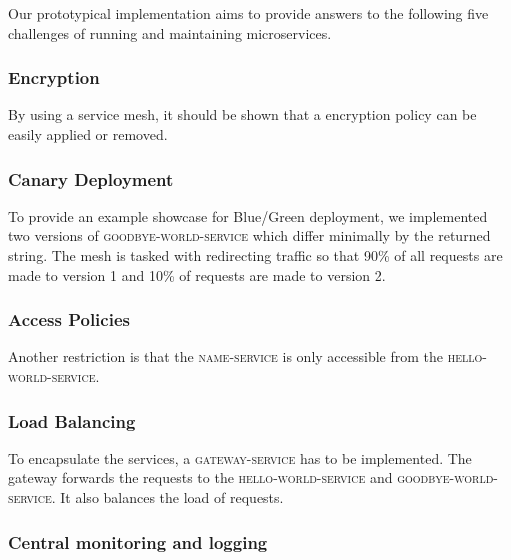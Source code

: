 Our prototypical implementation aims to provide answers to the following five challenges of running and maintaining microservices.

\subsubsection{Encryption}

By using a service mesh, it should be shown that a encryption policy can be easily applied or removed.

\subsubsection{Canary Deployment}

To provide an example showcase for Blue/Green deployment, we implemented two versions of \textsc{goodbye-world-service} which differ minimally by the returned string. The mesh is tasked with redirecting traffic so that 90\% of all requests are made to version 1 and 10\% of requests are made to version 2.

\subsubsection{Access Policies}

Another restriction is that the \textsc{name-service} is only accessible from the \textsc{hello-world-service}.

\subsubsection{Load Balancing}
To encapsulate the services, a \textsc{gateway-service} has to be implemented. The gateway forwards the requests to the \textsc{hello-world-service} and \textsc{goodbye-world-service}. It also balances the load of requests.

\subsubsection{Central monitoring and logging}